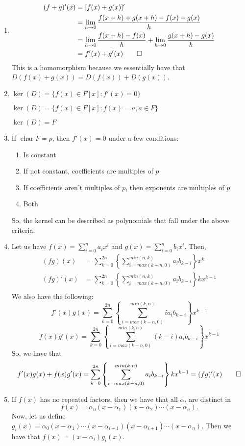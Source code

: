 \documentclass[12pt]{report}
\begin{document}
\begin{enumerate}[label=\alph*.]
    \item \begin{align*}
        (f+g)'(x) &= [f(x) + g(x)]' \\
        &= \lim_{h\to 0}\frac{f(x+h) + g(x+h) - f(x) - g(x)}{h} \\
        &= \lim_{h\to 0}\frac{f(x+h) - f(x)}{h} + \lim_{h\to 0}\frac{g(x+h) - g(x)}{h} \\
        &= f'(x) + g'(x) \qed
    \end{align*}
    This is a homomorphism because we essentially have that $D(f(x) + g(x)) = D(f(x)) + D(g(x))$.
    \item $\operatorname{ker}(D) = \{f(x) \in F[x] : f'(x) = 0\}$
    
    $\operatorname{ker}(D) = \{f(x) \in F[x] : f(x) = a, a\in F\}$

    $\operatorname{ker}(D) = F$
    \item If $\operatorname{char}F = p$, then $f'(x) = 0$ under a few conditions: 
    \begin{enumerate}
        \item Is constant
        \item If not constant, coefficients are multiples of $p$
        \item If coefficients aren't multiples of $p$, then exponents are multiples of $p$
        \item Both
    \end{enumerate}
    So, the kernel can be described as polynomials that fall under the above criteria.
    \item Let us have $f(x) = \sum_{i=0}^n a_ix^i$ and $g(x) = \sum_{i=0}^n b_ix^i$. Then,
    \begin{align*}
        (fg)(x) &= \sum _{k=0}^{2n}\left\{\sum_{i = max(k-n, 0)}^{min(n, k)}a_ib_{k-i}\right\}x^k \\ 
        (fg)'(x) &= \sum _{k=0}^{2n}\left\{\sum_{i = max(k-n, 0)}^{min(n, k)}a_ib_{k-i}\right\}kx^{k-1} \\
    \end{align*}
    We also have the following:
    $$f'(x)g(x) = \sum_{k=0}^{2n}\left\{\sum_{i = max(k-n, 0)}^{min(k,n)}ia_ib_{k-i}\right\}x^{k-1}$$
    $$f(x)g'(x) = \sum_{k=0}^{2n}\left\{\sum_{i = max(k-n, 0)}^{min(k,n)}(k-i)a_ib_{k-i}\right\}x^{k-1}$$
    So, we have that 
    $$f'(x)g(x) + f(x)g'(x) = \sum_{k=0}^{2n}\left\{\sum_{i = max(k-n, 0)}^{min(k,n)}a_ib_{k-i}\right\}kx^{k-1}
    = (fg)'(x) \qed$$
    \item If $f(x)$ has no repeated factors, then we have that all $\alpha_i$ are distinct in $$f(x) = \alpha_0(x - \alpha_1)(x-\alpha_2)\cdots(x-\alpha_n).$$ 
    Now, let us define $g_i(x) = \alpha_0(x - \alpha_1)\cdots(x-\alpha_{i-1})(x - \alpha_{i+1})\cdots (x - \alpha_n)$. Then we have that $f(x) = (x - \alpha_i)g_i(x)$. 


\end{enumerate}
\end{document}
